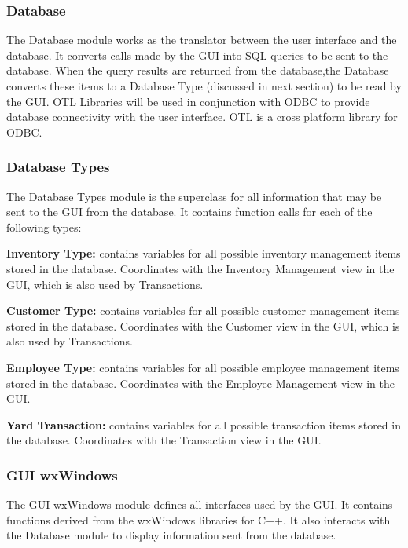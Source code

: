 \documentclass{report}
\begin{document}
        \subsubsection{Database}
        The Database module works as the translator between
        the user interface and the database.  It converts calls
        made by the GUI into SQL queries to be sent to the
        database.  When the query results are returned from the
        database,the Database converts these items to a
        Database Type (discussed in next section) to be read by the
        GUI. OTL Libraries will be used in conjunction with ODBC to
    provide database connectivity with the user interface. OTL is
    a cross platform library for ODBC.
        \subsubsection{Database Types}
        The Database Types module is the superclass for all information that
        may be sent to the GUI from the database.  It contains
        function calls for each of the following types:
        \begin{list}{}
            \item{{\bf Inventory Type:} contains variables for all
            possible inventory management items stored in the
            database.  Coordinates with the Inventory Management
            view in the GUI, which is also used by Transactions.}
            \item{{\bf Customer Type:} contains variables for
            all possible customer management items stored in the database.
            Coordinates with the Customer view in the GUI,
            which is also used by Transactions.}
            \item{{\bf Employee Type:} contains variables for
            all possible employee management items stored in the
            database.  Coordinates with the Employee Management
            view in the GUI.}
            \item{{\bf Yard Transaction:} contains variables for all
            possible transaction items stored in the database.
            Coordinates with the Transaction view in the GUI.}
        \end{list}{}
        \subsubsection{GUI wxWindows}
        The GUI wxWindows module defines all interfaces used by the
        GUI.  It contains functions derived from the wxWindows
        libraries for C++.  It also interacts with the
        Database module to display information sent from the
        database.
\end{document}
